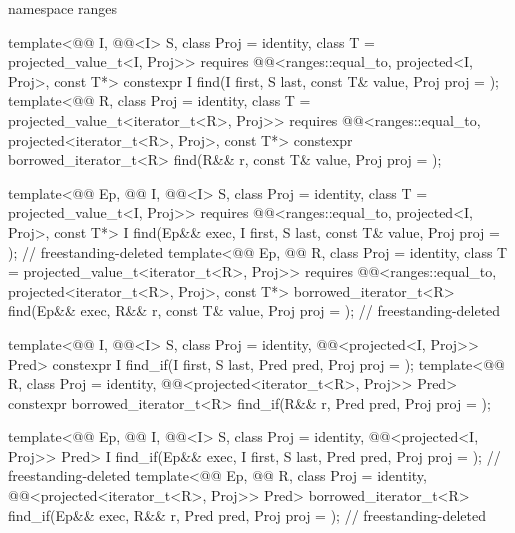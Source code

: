 \begin{codeblock}
{  namespace ranges {
    template<@@ I, @@<I> S, class Proj = identity,
             class T = projected_value_t<I, Proj>>
      requires @@<ranges::equal_to, projected<I, Proj>, const T*>
      constexpr I find(I first, S last, const T& value, Proj proj = {});
    template<@@ R, class Proj = identity,
             class T = projected_value_t<iterator_t<R>, Proj>>
      requires @@<ranges::equal_to,
                                         projected<iterator_t<R>, Proj>, const T*>
      constexpr borrowed_iterator_t<R>
        find(R&& r, const T& value, Proj proj = {});

    template<@@ Ep, @@ I, @@<I> S,
             class Proj = identity, class T = projected_value_t<I, Proj>>
      requires @@<ranges::equal_to, projected<I, Proj>, const T*>
      I find(Ep&& exec, I first, S last, const T& value, Proj proj = {});   // freestanding-deleted
    template<@@ Ep, @@ R, class Proj = identity,
             class T = projected_value_t<iterator_t<R>, Proj>>
      requires @@<ranges::equal_to,
                                         projected<iterator_t<R>, Proj>, const T*>
      borrowed_iterator_t<R>
        find(Ep&& exec, R&& r, const T& value, Proj proj = {});             // freestanding-deleted

    template<@@ I, @@<I> S, class Proj = identity,
             @@<projected<I, Proj>> Pred>
      constexpr I find_if(I first, S last, Pred pred, Proj proj = {});
    template<@@ R, class Proj = identity,
             @@<projected<iterator_t<R>, Proj>> Pred>
      constexpr borrowed_iterator_t<R>
        find_if(R&& r, Pred pred, Proj proj = {});

    template<@@ Ep, @@ I, @@<I> S,
             class Proj = identity, @@<projected<I, Proj>> Pred>
      I find_if(Ep&& exec, I first, S last, Pred pred, Proj proj = {});     // freestanding-deleted
    template<@@ Ep, @@ R, class Proj = identity,
             @@<projected<iterator_t<R>, Proj>> Pred>
      borrowed_iterator_t<R>
        find_if(Ep&& exec, R&& r, Pred pred, Proj proj = {});               // freestanding-deleted

}}
\end{codeblock}
